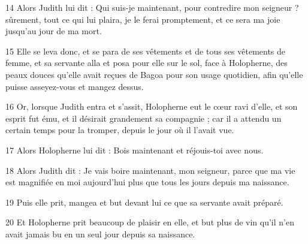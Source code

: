 \par 14 Alors Judith lui dit : Qui suis-je maintenant, pour contredire mon seigneur ? sûrement, tout ce qui lui plaira, je le ferai promptement, et ce sera ma joie jusqu'au jour de ma mort.
\par 15 Elle se leva donc, et se para de ses vêtements et de tous ses vêtements de femme, et sa servante alla et posa pour elle sur le sol, face à Holopherne, des peaux douces qu'elle avait reçues de Bagoa pour son usage quotidien, afin qu'elle puisse asseyez-vous et mangez dessus.
\par 16 Or, lorsque Judith entra et s'assit, Holopherne eut le cœur ravi d'elle, et son esprit fut ému, et il désirait grandement sa compagnie ; car il a attendu un certain temps pour la tromper, depuis le jour où il l'avait vue.
\par 17 Alors Holopherne lui dit : Bois maintenant et réjouis-toi avec nous.
\par 18 Alors Judith dit : Je vais boire maintenant, mon seigneur, parce que ma vie est magnifiée en moi aujourd'hui plus que tous les jours depuis ma naissance.
\par 19 Puis elle prit, mangea et but devant lui ce que sa servante avait préparé.
\par 20 Et Holopherne prit beaucoup de plaisir en elle, et but plus de vin qu'il n'en avait jamais bu en un seul jour depuis sa naissance.


